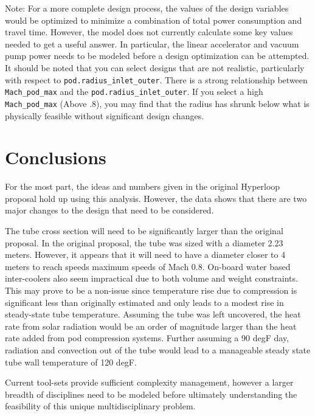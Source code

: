 \documentclass[heading.tex]{subfiles}
\begin{document}
Note: For a more complete design process, the values of the design variables would be optimized to minimize a combination of total power
consumption and travel time. However, the model does not currently calculate some key values needed to get a useful answer. In particular,
the linear accelerator and vacuum pump power needs to be modeled before a design optimization can be attempted.
It should be noted that you can select designs that are not realistic, particularly with respect to \texttt{pod.radius\_inlet\_outer}. There is
a strong relationship between \texttt{Mach\_pod\_max} and the \texttt{pod.radius\_inlet\_outer}. If you select a high 
\texttt{Mach\_pod\_max} (Above .8), you may find that the radius has shrunk below what is physically feasible without significant design
changes.


\section{Conclusions}
For the most part, the ideas and numbers given in the original Hyperloop proposal hold up using this analysis. However, the data shows that
there are two major changes to the design that need to be considered.

The tube cross section will need to be significantly larger than the original proposal. In the original proposal, the tube was sized with a diameter 2.23
meters. However, it appears that it will need to have a diameter closer to 4 meters to reach speeds maximum speeds of Mach 0.8.
On-board water based inter-coolers also seem impractical due to both volume and weight constraints. This may prove to be a non-issue since
temperature rise due to compression is significant less than originally estimated and only leads to a modest rise in steady-state tube
temperature. Assuming the tube was left uncovered, the heat rate from solar radiation would be an order of magnitude larger than the heat
rate added from pod compression systems. Further assuming a 90 degF day, radiation and convection out of the tube would lead to a
manageable steady state tube wall temperature of 120 degF.

Current tool-sets provide sufficient complexity management, however a larger breadth of disciplines need to be modeled before ultimately understanding
the feasibility of this unique multidisciplinary problem.

\end{document}
